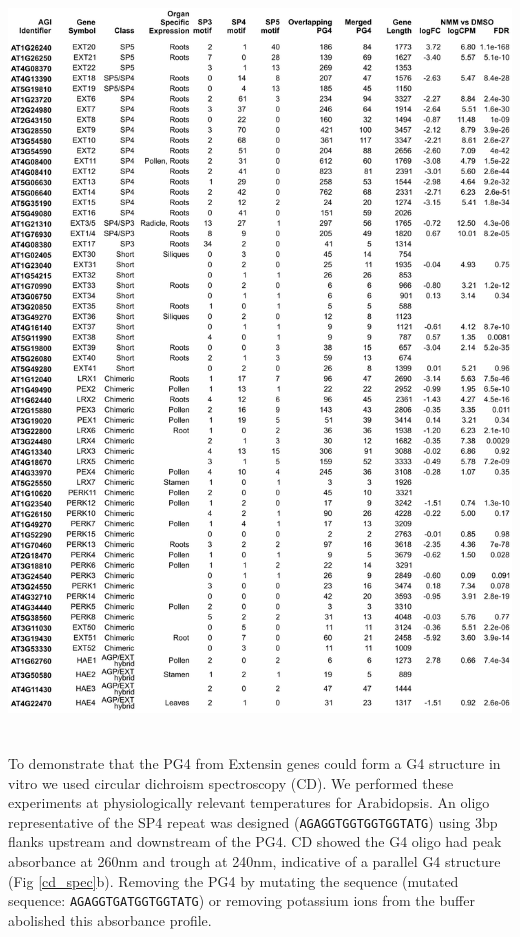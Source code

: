 \documentclass[12pt,a4paper,]{report}
\let\origfigure=\figure
\let\endorigfigure=\endfigure
\renewenvironment{figure}[1][2] {
    \expandafter\origfigure\expandafter[H]
} {
    \endorigfigure
}
\begin{document}
\begin{figure}[htbp]
\centering
\includegraphics[width=\textwidth,height=562pt,keepaspectratio]{chapter_6/figures/ext_family_showalter_table.png}
\caption[The Extensin gene family contains large numbers of hardcoded PG4s]{\textbf{The   Extensin   gene   family   contains   large   numbers   of   hardcoded   PG4s}   Table   showing   extended   Extensin   gene   family,   their   expression   patterns,   SP4   motif   counts,   PG4   counts   and   expression   during   NMM   treatment.   Adapted   from   Showalter   et   al. 2010   \label{ext_table}}
\end{figure}

\newpage

To demonstrate that the PG4 from Extensin genes could form a G4
structure in vitro we used circular dichroism spectroscopy (CD). We
performed these experiments at physiologically relevant temperatures for
Arabidopsis. An oligo representative of the SP4 repeat was designed
(\texttt{AGAGGTGGTGGTGGTATG}) using 3bp flanks upstream and downstream
of the PG4. CD showed the G4 oligo had peak absorbance at 260nm and
trough at 240nm, indicative of a parallel G4 structure (Fig
\ref{cd_spec}b). Removing the PG4 by mutating the sequence (mutated
sequence: \texttt{AGAGGTGATGGTGGTATG}) or removing potassium ions from
the buffer abolished this absorbance profile.
\end{document}
